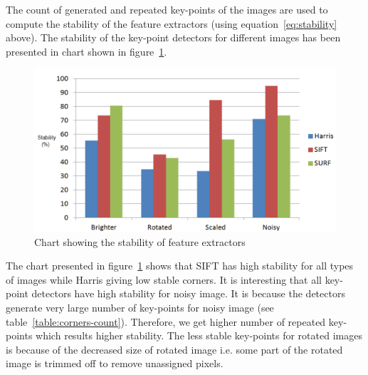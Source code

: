 \noindent The count of generated and repeated key-points of the images are used to compute the stability of the feature extractors (using equation~\ref{eq:stability} above). The stability of the key-point detectors for different images has been  presented in chart shown in figure~\ref{fig:repeatability-chart}.



\begin{figure}[H]%
\centering
\includegraphics[width=\columnwidth]{2.mainmatter/2.Methodology/FeaturesExtraction/figures/feature-extraction-stability}%
\caption[Comparison: Stability of Corners]{Chart showing the stability of  feature extractors}%
\label{fig:repeatability-chart}%
\end{figure}

\noindent The chart presented in figure~\ref{fig:repeatability-chart} shows that SIFT has high stability for all types of images while Harris giving low stable corners. It is interesting that all key-point detectors have high stability for noisy image. It is because the detectors generate very large number of key-points for noisy image (see table~\ref{table:corners-count}). Therefore, we get higher number of repeated key-points which results higher stability. The less stable key-points for rotated images is because of the decreased size of rotated image i.e. some part of the rotated image is trimmed off to remove unassigned pixels.\\

